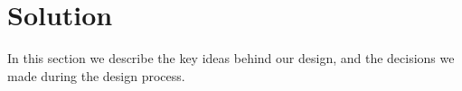 \section{Solution}
In this section we describe the key ideas behind our design, and the decisions we made during the design process.
